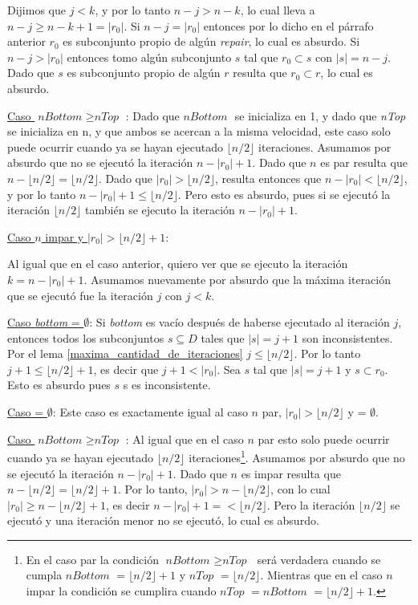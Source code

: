 \documentclass[11pt,a4paper,twoside]{tesis}
\newcommand{\parteEntera}{\lfloor n/2 \rfloor}
\newcommand{\nBottom}{\textit{nBottom }}
\newcommand{\nTop}{\textit{nTop }}
\newcommand{\bottom}{\textit{bottom }}
\begin{document}
Dijimos que $j < k$, y por lo tanto $n - j > n - k$, lo cual lleva a $n - j \geq n - k + 1 =|r_{0}|$. Si $n - j = |r_{0}|$ entonces por lo dicho en el párrafo anterior $r_0$ es subconjunto propio de algún \textit{repair}, lo cual es absurdo. Si $n - j > |r_0|$ entonces tomo algún subconjunto $s$ tal que $r_0 \subset s$ con $|s| = n - j$. Dado que $s$ es subconjunto propio de algún  $r$ resulta que $r_0 \subset r$, lo cual es absurdo.

\underline{Caso $\nBottom \geq \nTop$}: Dado que $\nBottom$ se inicializa en 1, y dado que \nTop se inicializa en n, y que ambos se acercan a la misma velocidad, este caso solo puede ocurrir cuando ya se hayan ejecutado $\parteEntera$ iteraciones. Asumamos por absurdo que no se ejecutó la iteración $n - |r_0| + 1$. Dado que $n$ es par resulta que $n - \parteEntera = \parteEntera$. Dado que $|r_0| > \parteEntera$, resulta entonces que $n - |r_0| < \parteEntera$, y por lo tanto $n - |r_0| + 1 \leq \parteEntera$. Pero esto es absurdo, pues si se ejecutó la iteración $\parteEntera$ también se ejecuto la iteración $n - |r_0| + 1$.

\underline{Caso $n$ impar y $|r_0| > \parteEntera + 1$}:

Al igual que en el caso anterior, quiero ver que se ejecuto la iteración $k = n - |r_0| + 1$. Asumamos nuevamente por absurdo que la máxima iteración que se ejecutó fue la iteración $j$ con $j < k$.

\underline{Caso \bottom = $\emptyset$}: Si \bottom es vacío después de haberse ejecutado al iteración $j$, entonces todos los subconjuntos $s \subseteq D$ tales que $|s| = j + 1$ son inconsistentes. Por el lema \ref{maxima_cantidad_de_iteraciones} $j\leq \parteEntera$. Por lo tanto $j+1 \leq \parteEntera + 1$, es decir que $j + 1 < |r_0|$. Sea $s$ tal que $|s| = j + 1$ y $s \subset r_0$. Esto es absurdo pues $s$ s es inconsistente.

\underline{Caso  = $\emptyset$}: Este caso es exactamente igual al caso $n$ par, $|r_0| > \parteEntera$ y  = $\emptyset$.

\underline{Caso $\nBottom \geq \nTop$}: Al igual que en el caso $n$ par esto solo puede ocurrir cuando ya se hayan ejecutado $\parteEntera$ iteraciones\footnote{En el caso par la condición $\nBottom \geq \nTop$ será verdadera cuando se cumpla $\nBottom = \parteEntera + 1$ y $\nTop = \parteEntera$. Mientras que en el caso $n$ impar la condición se cumplira cuando $\nTop = \nBottom = \parteEntera + 1$.}. Asumamos por absurdo que no se ejecutó la iteración $n - |r_0| + 1$. Dado que $n$ es impar resulta que $n - \parteEntera = \parteEntera + 1$. Por lo tanto, $|r_0| > n - \parteEntera$, con lo cual $|r_0| \geq n - \parteEntera + 1$, es decir  $n - |r_0| + 1 =< \parteEntera$. Pero la iteración $\parteEntera$ se ejecutó y una iteración menor no se ejecutó, lo cual es absurdo.
\end{document}
